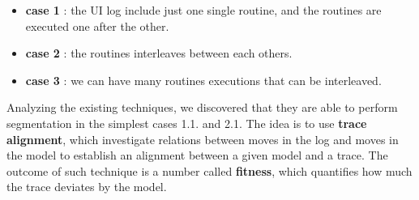 \documentclass[11pt]{article}
\begin{document}
\begin{itemize}
\item \textbf{case 1} : the UI log include just one single routine, and the routines are executed one after the other.

\item \textbf{case 2} : the routines interleaves between each others.

\item \textbf{case 3} : we can have many routines executions that can be interleaved.
\end{itemize} 

Analyzing the existing techniques, we discovered that they are able to perform segmentation in the simplest cases 1.1. and 2.1. The idea is to use \textbf{trace alignment}, which investigate relations between moves in the log and moves in the model to establish an alignment between a given model and a trace. The outcome of such technique is a number called \textbf{fitness}, which quantifies how much the trace deviates by the model. 
\end{document}
